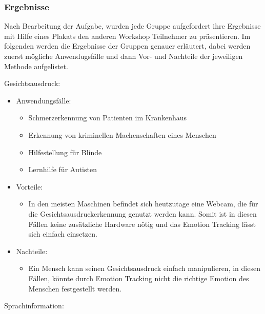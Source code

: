 \subsubsection*{Ergebnisse}\label{Umsetzung_Anwendungsfaelle_Ergebnisse}
Nach Bearbeitung der Aufgabe, wurden jede Gruppe aufgefordert ihre Ergebnisse mit Hilfe eines Plakats den anderen Workshop Teilnehmer zu präsentieren. Im folgenden werden die Ergebnisse der Gruppen genauer erläutert, dabei werden zuerst mögliche Anwendugsfälle und dann Vor- und Nachteile der jeweiligen Methode aufgelistet.\newline

\noindent Gesichtsausdruck:
\begin{itemize}
	\item Anwendungsfälle:
	\begin{itemize}
		\item Schmerzerkennung von Patienten im Krankenhaus
		\item Erkennung von kriminellen Machenschaften eines Menschen
		\item Hilfestellung für Blinde
		\item Lernhilfe für Autisten
	\end{itemize}
	\item Vorteile:
	\begin{itemize}
		\item In den meisten Maschinen befindet sich heutzutage eine Webcam, die für die Gesichtsausdruckerkennung genutzt werden kann. Somit ist in diesen Fällen keine zusätzliche Hardware nötig und das Emotion Tracking lässt sich einfach einsetzen.		 
	\end{itemize}
	\item Nachteile:
	\begin{itemize}
		\item Ein Mensch kann seinen Gesichtsausdruck einfach manipulieren, in diesen Fällen, könnte durch Emotion Tracking nicht die richtige Emotion des Menschen festgestellt werden.
	\end{itemize}
\end{itemize}
\vspace{2mm}
Sprachinformation: 
